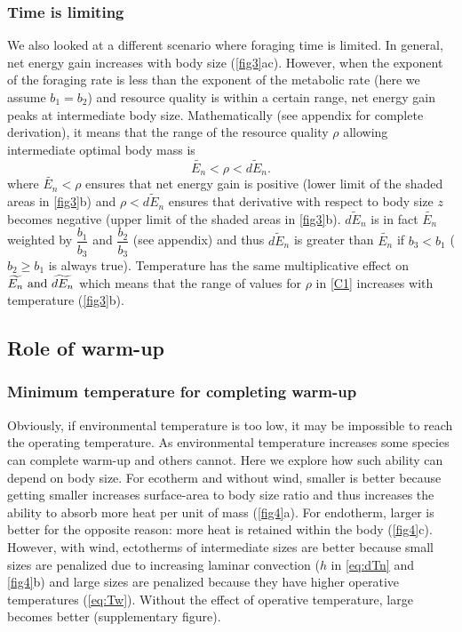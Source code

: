 \subsubsection*{Time is limiting}
We also looked at a different scenario where foraging time is limited.
In general, net energy gain increases with body size (\cref{fig3}ac).
However, when the exponent of the foraging rate is less than the exponent of the metabolic rate (here we assume $b_1 =b_2$) and resource quality is within a certain range,  net energy gain peaks at intermediate body size.
Mathematically (see appendix for complete derivation), it means that the range of the resource quality $\rho$ allowing intermediate optimal body mass is 
\begin{equation}\label{C1}
	\widetilde{E_n} < \rho < \widetilde{dE_n}.
\end{equation}
where $\widetilde{E_n} < \rho $ ensures that net energy gain is positive (lower limit of the shaded areas in \cref{fig3}b) and $\rho < \widetilde{dE_n}$ ensures that derivative with respect to body size $z$ becomes negative (upper limit of the shaded areas in \cref{fig3}b).
$\widetilde{dE_n}$ is in fact $\widetilde{E_n}$ weighted by $\dfrac{b_1}{b_3}$  and $\dfrac{b_2}{b_3}$ (see appendix) and thus $\widetilde{dE_n}$ is greater than $\widetilde{E_n}$ if  $b_3 < b_1$ ($b_2 \geq b_1$ is always true). 
Temperature has the same multiplicative effect on $\widetilde{E_n}\textnormal{ and }\widetilde{dE_n}$ which means that the range of values for $\rho$ in \cref{C1} increases with temperature (\cref{fig3}b).
\subsection*{Role of warm-up}
\subsubsection*{Minimum temperature for completing warm-up}
Obviously, if environmental temperature is too low, it may be impossible to reach the operating temperature. 
As environmental temperature increases some species can complete warm-up and others cannot.
Here we explore how such ability can depend on body size.
For ecotherm and without wind, smaller is better because getting smaller increases surface-area to body size ratio and thus increases the ability to absorb more heat per unit of mass  (\cref{fig4}a). 
For endotherm, larger is better for the opposite reason: more heat is retained within the body  (\cref{fig4}c). 
However, with wind, ectotherms of intermediate sizes are better because small sizes are penalized due to increasing laminar convection ($h$ in \cref{eq:dTn} and \cref{fig4}b)  and large sizes are penalized because they have higher operative temperatures (\cref{eq:Tw}). 
Without the effect of operative temperature, large becomes better (supplementary figure).
